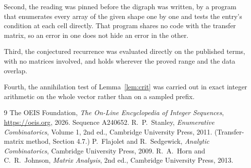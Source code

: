\documentclass[11pt,a4paper]{article}
\theoremstyle{plain}
\theoremstyle{definition}
\begin{document}
Second, the reading was pinned before the digraph was written, by a program that enumerates
every array of the given shape one by one and tests the entry's condition at each cell
directly. That program shares no code with the transfer matrix, so an error in one does not
hide an error in the other.

Third, the conjectured recurrence was evaluated directly on the published terms, with no
matrices involved, and holds wherever the proved range and the data overlap.

Fourth, the annihilation test of Lemma~\ref{lem:crit} was carried out in exact integer
arithmetic on the whole vector rather than on a sampled prefix.

\begin{thebibliography}{9}
 The OEIS Foundation, \emph{The On-Line Encyclopedia of Integer
Sequences}, \url{https://oeis.org}, 2026. Sequence A240652.
 R.~P.~Stanley, \emph{Enumerative Combinatorics}, Volume 1, 2nd ed.,
Cambridge University Press, 2011. (Transfer-matrix method, Section 4.7.)
 P.~Flajolet and R.~Sedgewick, \emph{Analytic Combinatorics}, Cambridge
University Press, 2009.
 R.~A.~Horn and C.~R.~Johnson, \emph{Matrix Analysis}, 2nd ed., Cambridge
University Press, 2013.
\end{thebibliography}
\end{document}
